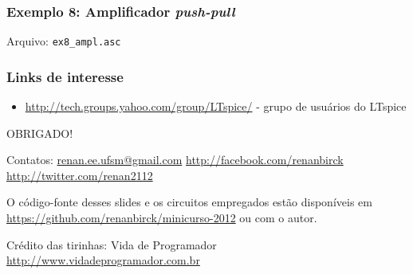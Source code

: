 \documentclass{beamer}
\begin{document}
\begin{frame}
\frametitle{Exemplo 8: Amplificador \textit{push-pull}}
Arquivo: \texttt{ex8\_ampl.asc}
\end{frame}

\begin{frame}
\frametitle{Links de interesse}
\begin{itemize}
\item \url{http://tech.groups.yahoo.com/group/LTspice/} - grupo de usuários do LTspice
\end{itemize}
\end{frame}

\begin{frame}
{\LARGE OBRIGADO!}
\end{frame}

\begin{frame}
Contatos: \url{renan.ee.ufsm@gmail.com} \url{http://facebook.com/renanbirck} \url{http://twitter.com/renan2112}\newline

O código-fonte desses slides e os circuitos empregados estão disponíveis em \url{https://github.com/renanbirck/minicurso-2012} ou com o autor.

Crédito das tirinhas: Vida de Programador \url{http://www.vidadeprogramador.com.br}
\end{frame}
\end{document}
